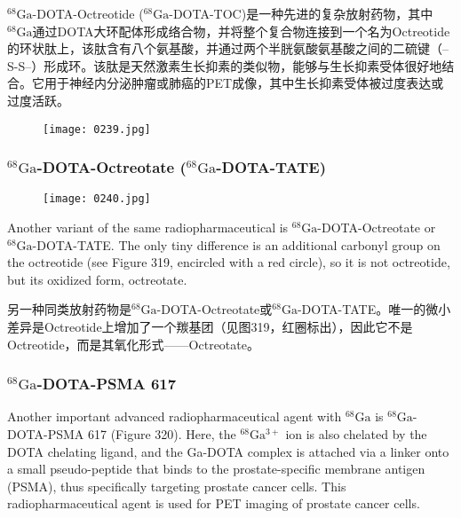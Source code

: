 \documentclass[dvipsnames, svgnames,a4paper,11pt]{article}
\begin{document}
\(\mathrm{^{68}Ga}\)-DOTA-Octreotide (\(\mathrm{^{68}Ga}\)-DOTA-TOC)是一种先进的复杂放射药物，其中\(\mathrm{^{68}Ga}\)通过DOTA大环配体形成络合物，并将整个复合物连接到一个名为Octreotide的环状肽上，该肽含有八个氨基酸，并通过两个半胱氨酸氨基酸之间的二硫键（–S-S–）形成环。该肽是天然激素生长抑素的类似物，能够与生长抑素受体很好地结合。它用于神经内分泌肿瘤或肺癌的PET成像，其中生长抑素受体被过度表达或过度活跃。

\begin{figure}[h]
	\centering
    \texttt{[image: 0239.jpg]}  
     \label{fig318}
\end{figure}

\subsubsection{\(\mathrm{^{68}Ga}\)-DOTA-Octreotate (\(\mathrm{^{68}Ga}\)-DOTA-TATE)}  
\begin{figure}[h]
	\centering
    \texttt{[image: 0240.jpg]}  
     \label{fig319}
\end{figure}

Another variant of the same radiopharmaceutical is \(\mathrm{^{68}Ga}\)-DOTA-Octreotate or \(\mathrm{^{68}Ga}\)-DOTA-TATE. The only tiny difference is an additional carbonyl group on the octreotide (see Figure 319, encircled with a red circle), so it is not octreotide, but its oxidized form, octreotate.



另一种同类放射药物是\(\mathrm{^{68}Ga}\)-DOTA-Octreotate或\(\mathrm{^{68}Ga}\)-DOTA-TATE。唯一的微小差异是Octreotide上增加了一个羰基团（见图319，红圈标出），因此它不是Octreotide，而是其氧化形式——Octreotate。



\subsubsection{\(\mathrm{^{68}Ga}\)-DOTA-PSMA 617}  
Another important advanced radiopharmaceutical agent with \(\mathrm{^{68}Ga}\) is \(\mathrm{^{68}Ga}\)-DOTA-PSMA 617 (Figure 320). Here, the \(\mathrm{^{68}Ga^{3+}}\) ion is also chelated by the DOTA chelating ligand, and the Ga-DOTA complex is attached via a linker onto a small pseudo-peptide that binds to the prostate-specific membrane antigen (PSMA), thus specifically targeting prostate cancer cells. This radiopharmaceutical agent is used for PET imaging of prostate cancer cells.
\end{document}
